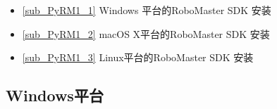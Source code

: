 
\begin{issues}
\issueTODO
\end{issues}

\begin{itemize}
\item \autoref{sub_PyRM1_1} Windows 平台的RoboMaster SDK 安装
\item \autoref{sub_PyRM1_2} macOS X平台的RoboMaster SDK 安装
\item \autoref{sub_PyRM1_3} Linux平台的RoboMaster SDK 安装
\end{itemize}

\subsection{Windows平台}\label{sub_PyRM1_1}
